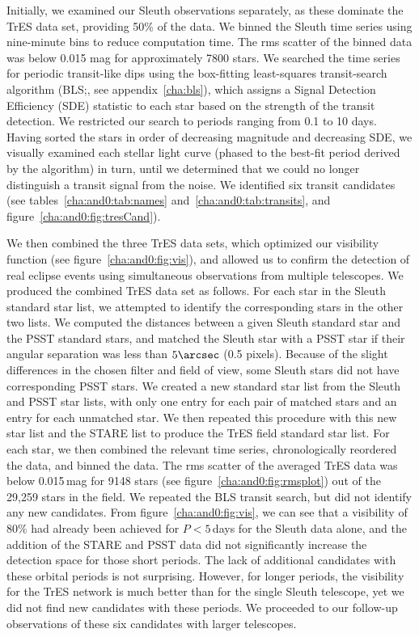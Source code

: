 Initially, we examined our Sleuth observations separately, as these dominate the TrES data set, providing 50\% of the
data. We binned the Sleuth time series using nine-minute bins to reduce computation time.
The rms scatter of the binned data was below 0.015 mag for approximately 7800 stars.
We searched the time series for periodic transit-like dips using the box-fitting least-squares transit-search algorithm
(BLS;\@\citealt*{Kovacs_Zucker_Mazeh:aa:2002a}, see appendix~\ref{cha:bls}), which assigns a Signal Detection
Efficiency (SDE) statistic to each star based on the strength of the transit detection.
We restricted our search to periods ranging from 0.1 to 10 days. Having sorted the stars in order of decreasing
magnitude and decreasing SDE, we visually examined each stellar light curve (phased to the best-fit period derived by
the algorithm) in turn, until we determined that we could no longer distinguish a transit signal from the noise.
We identified six transit candidates (see tables~\ref{cha:and0:tab:names} and~\ref{cha:and0:tab:transits},
and figure~\ref{cha:and0:fig:tresCand}).

We then combined the three TrES data sets, which optimized our visibility function (see figure~\ref{cha:and0:fig:vis}), and allowed us to confirm the detection of real eclipse events using simultaneous observations from multiple telescopes. We produced the combined TrES data set as follows. For each star in the Sleuth standard star list, we attempted to identify the corresponding stars in the other two lists. We computed the distances between a given Sleuth standard star and the PSST standard stars, and matched the Sleuth star with a PSST star if their angular separation was less than $5\arcsec$ (0.5 pixels). Because of the slight differences in the chosen filter and field of view, some Sleuth stars did not have corresponding PSST stars. We created a new standard star list from the Sleuth and PSST star lists, with only one entry for each pair of matched stars and an entry for each unmatched star. We then repeated this procedure with this new star list and the STARE list to produce the TrES field standard star list. For each star, we then combined the relevant time series, chronologically reordered the data, and binned the data. The rms scatter of the averaged TrES data was below 0.015\,mag for 9148 stars (see figure~\ref{cha:and0:fig:rmsplot}) out of the 29,259 stars in the field. We repeated the BLS transit search, but did not identify any new candidates. From figure~\ref{cha:and0:fig:vis}, we can see that a visibility of 80\% had already been achieved for $P<5$\,days for the Sleuth data alone, and the addition of the STARE and PSST data did not significantly increase the detection space for those short periods. The lack of additional candidates with these orbital periods is not surprising. However, for longer periods, the visibility for the TrES network is much better than for the single Sleuth telescope, yet we did not find new candidates with these periods. We proceeded to our follow-up observations of these six candidates with larger telescopes.

